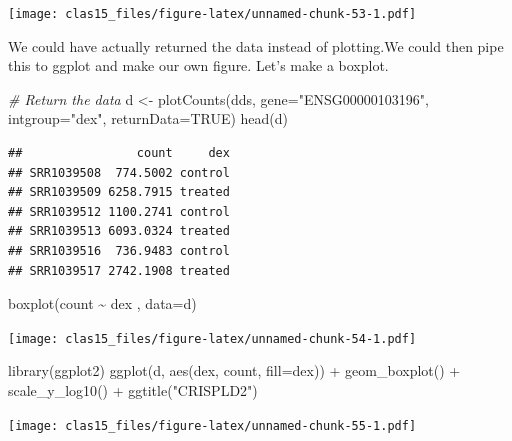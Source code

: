 \documentclass[
]{article}
\newenvironment{Shaded}{\begin{snugshade}}{\end{snugshade}}
\newcommand{\AttributeTok}[1]{\textcolor[rgb]{0.77,0.63,0.00}{#1}}
\newcommand{\CommentTok}[1]{\textcolor[rgb]{0.56,0.35,0.01}{\textit{#1}}}
\newcommand{\ConstantTok}[1]{\textcolor[rgb]{0.00,0.00,0.00}{#1}}
\newcommand{\FunctionTok}[1]{\textcolor[rgb]{0.00,0.00,0.00}{#1}}
\newcommand{\NormalTok}[1]{#1}
\newcommand{\OtherTok}[1]{\textcolor[rgb]{0.56,0.35,0.01}{#1}}
\newcommand{\SpecialCharTok}[1]{\textcolor[rgb]{0.00,0.00,0.00}{#1}}
\newcommand{\StringTok}[1]{\textcolor[rgb]{0.31,0.60,0.02}{#1}}
\begin{document}
\texttt{[image: clas15\_files/figure-latex/unnamed-chunk-53-1.pdf]}

We could have actually returned the data instead of plotting.We could
then pipe this to ggplot and make our own figure. Let's make a boxplot.

\begin{Shaded}
\begin{Highlighting}[]
\CommentTok{\# Return the data}
\NormalTok{d }\OtherTok{\textless{}{-}} \FunctionTok{plotCounts}\NormalTok{(dds, }\AttributeTok{gene=}\StringTok{"ENSG00000103196"}\NormalTok{, }\AttributeTok{intgroup=}\StringTok{"dex"}\NormalTok{, }\AttributeTok{returnData=}\ConstantTok{TRUE}\NormalTok{)}
\FunctionTok{head}\NormalTok{(d)}
\end{Highlighting}
\end{Shaded}

\begin{verbatim}
##                count     dex
## SRR1039508  774.5002 control
## SRR1039509 6258.7915 treated
## SRR1039512 1100.2741 control
## SRR1039513 6093.0324 treated
## SRR1039516  736.9483 control
## SRR1039517 2742.1908 treated
\end{verbatim}

\begin{Shaded}
\begin{Highlighting}[]
\FunctionTok{boxplot}\NormalTok{(count }\SpecialCharTok{\textasciitilde{}}\NormalTok{ dex , }\AttributeTok{data=}\NormalTok{d)}
\end{Highlighting}
\end{Shaded}

\texttt{[image: clas15\_files/figure-latex/unnamed-chunk-54-1.pdf]}

\begin{Shaded}
\begin{Highlighting}[]
\FunctionTok{library}\NormalTok{(ggplot2)}
\FunctionTok{ggplot}\NormalTok{(d, }\FunctionTok{aes}\NormalTok{(dex, count, }\AttributeTok{fill=}\NormalTok{dex)) }\SpecialCharTok{+} 
  \FunctionTok{geom\_boxplot}\NormalTok{() }\SpecialCharTok{+} 
  \FunctionTok{scale\_y\_log10}\NormalTok{() }\SpecialCharTok{+} 
  \FunctionTok{ggtitle}\NormalTok{(}\StringTok{"CRISPLD2"}\NormalTok{)}
\end{Highlighting}
\end{Shaded}

\texttt{[image: clas15\_files/figure-latex/unnamed-chunk-55-1.pdf]}
\end{document}
